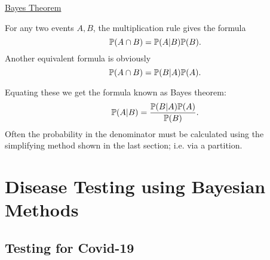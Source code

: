 \documentclass[10pt, a4paper]{article}
\begin{document}
\underline{Bayes Theorem}

For any two events $A, B$,
the multiplication rule gives the formula
\[
\P(A \cap B) = \P(A | B)\P(B).
\]
Another equivalent formula is obviously
\[
\P(A \cap B) = \P(B | A)\P(A).
\]

Equating these we get the formula known as Bayes theorem:
\[
\P(A | B) = \frac{\P(B | A)\P(A)}{\P(B)}.
\]
Often the probability in the denominator must be calculated using the simplifying method shown in the last section;
i.e. via a partition.

\newpage

\section{Disease Testing using Bayesian Methods}

\subsection{Testing for Covid-19}
\end{document}
